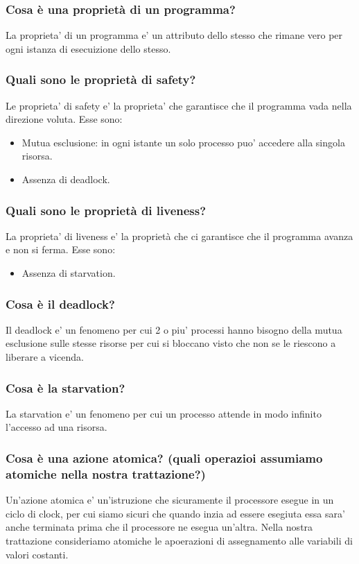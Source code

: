 \documentclass{article}
\begin{document}
\subsubsection{Cosa è una proprietà di un programma?}
La proprieta' di un programma e' un attributo dello stesso che rimane vero per
ogni istanza di esecuizione dello stesso.

\subsubsection{Quali sono le proprietà di safety?}
Le proprieta' di safety e' la proprieta' che garantisce che il programma vada
nella direzione voluta. Esse sono:
\begin{itemize}
    \item Mutua esclusione: in ogni istante un solo processo puo' accedere alla singola
          risorsa.
    \item Assenza di deadlock.
\end{itemize}

\subsubsection{Quali sono le proprietà di liveness?}
La proprieta' di liveness e' la proprietà che ci garantisce che il programma
avanza e non si ferma. Esse sono:
\begin{itemize}
    \item Assenza di starvation.
\end{itemize}

\subsubsection{Cosa è il deadlock?}
Il deadlock e' un fenomeno per cui 2 o piu' processi hanno bisogno della mutua
esclusione sulle stesse risorse per cui si bloccano visto che non se le
riescono a liberare a vicenda.

\subsubsection{Cosa è la starvation?}
La starvation e' un fenomeno per cui un processo attende in modo infinito
l'accesso ad una risorsa.

\subsubsection{Cosa è una azione atomica?
    (quali operazioi assumiamo atomiche nella nostra trattazione?)}
Un'azione atomica e' un'istruzione che sicuramente il processore esegue in un
ciclo di clock, per cui siamo sicuri che quando inzia ad essere esegiuta essa
sara' anche terminata prima che il processore ne esegua un'altra. Nella nostra
trattazione consideriamo atomiche le apoerazioni di assegnamento alle variabili
di valori costanti.
\end{document}
